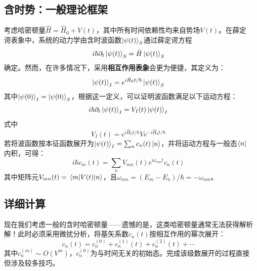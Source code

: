 \subsection{含时势：一般理论框架}
考虑哈密顿量$\hat{H}=\hat{H}_0+V(t)$，其中所有时间依赖性均来自势场$V(t)$。在薛定谔表象中，系统的动力学由含时波函数$\ket{\psi(t)}_S$通过薛定谔方程
\begin{equation}
	i\hbar\partial_t\ket{\psi(t)}_S=\hat{H}\ket{\psi(t)}_S
\end{equation}
确定。然而，在许多情况下，采用\textbf{相互作用表象}会更为便捷，其定义为：
\begin{equation}
	\ket{\psi(t)}_I=e^{i\hat{H}_0 t/\hbar}\ket{\psi(t)}_S
\end{equation}
其中$\ket{\psi(0)}_I=\ket{\psi(0)}_S$，根据这一定义，可以证明波函数满足以下运动方程：
\begin{equation}
	i\hbar\partial_t\ket{\psi(t)}_I=V_I(t)\ket{\psi(t)}_I
\end{equation}
式中
\begin{equation}
	V_I(t)=e^{i\hat{H}_0 t/\hbar}Ve^{-i\hat{H}_0 t/\hbar}
\end{equation}
若将波函数按本征函数展开为$\ket{\psi(t)}_I=\sum_n c_n(t)\ket{n}$，并将运动方程与一般态$\bra{n}$内积，可得：
\begin{equation}
	i\hbar\dot{c}_m(t)=\sum_n V_{mn}(t)e^{i\omega_{mn}t}c_n(t)
\end{equation}
其中矩阵元$V_{mn}(t)=\matrixel{m}{V(t)}{n}$，且$\omega_{mn}=(E_m-E_n)/\hbar=-\omega_{nm}$。

\subsection{详细计算}
现在我们考虑一般的含时哈密顿量——遗憾的是，这类哈密顿量通常无法获得解析解！此时必须采用微扰分析，将基矢系数$c_n(t)$按相互作用的幂次展开：
\begin{equation}
	c_n(t)=c_n^{(0)}+c_n^{(1)}(t)+c_n^{(2)}(t)+\cdots
\end{equation}
其中$c_n^{(m)}\sim O(V^m)$，$c_n^{(0)}$为与时间无关的初始态。完成该级数展开的过程直接但涉及较多技巧。

